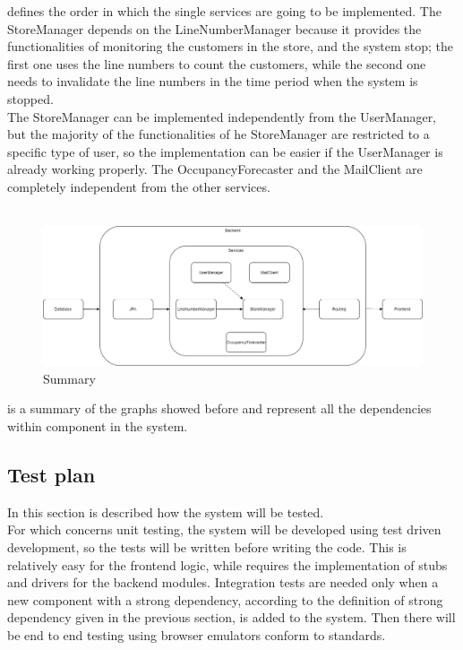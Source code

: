  defines the order in which the single services are going to be implemented.
The StoreManager depends on the LineNumberManager because it provides the functionalities of monitoring the customers in the store, and the
system stop;
the first one uses the line numbers to count the customers, while the second one needs to invalidate the line numbers
in the time period when the system is stopped.\\
The StoreManager can be implemented independently from the UserManager, but the majority of the functionalities of he StoreManager
are restricted to a specific type of user, so the implementation can be easier if the UserManager is already working properly.
The OccupancyForecaster and the MailClient are completely independent from the other services.\\
\\
\begin{figure}[H]
    \centering
    \includegraphics[height=0.4\textwidth]{Images/IntegrationAndTestingPlan/Summary.png}
    \caption{Summary}
    \label{fig:Summary}
\end{figure}
 is a summary of the graphs showed before and represent all the dependencies within component in the system.

\subsection{Test plan}
In this section is described how the system will be tested. \\
For which concerns unit testing, the system will be developed using test driven development, so the tests will be written before writing the code.
This is relatively easy for the frontend logic, while requires the implementation of stubs and drivers for the backend modules.
Integration tests are needed only when a new component with a strong dependency, according to the definition of strong dependency
given in the previous section, is added to the system.
Then there will be end to end testing using browser emulators conform to standards.
